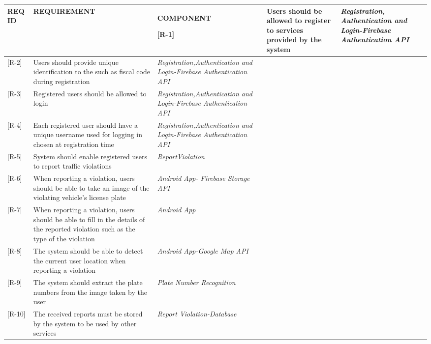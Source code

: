 \begin{table}[H]
\footnotesize
\centering
\settowidth{}
\setlength\extrarowheight{2pt}
\begin{tabulary}{\textwidth}{|J|J|J|}
\hline
 \textbf{REQ ID} & \textbf{REQUIREMENT} & \textbf{COMPONENT}   \hline

 [R-1] & Users should be allowed to register to services provided by the system & \emph{Registration, Authentication and Login-Firebase Authentication API} \\ \hline 
 
 [R-2] & Users should provide unique identification to the such as fiscal code during registration & \emph{Registration,Authentication and Login-Firebase Authentication API} 		\\ \hline 
 
 [R-3] & Registered users should be allowed to login & \emph{Registration,Authentication and Login-Firebase Authentication API} 		\\ \hline 
 
 [R-4] & Each registered user should have a unique username used for logging in chosen at registration time & \emph{Registration,Authentication and Login-Firebase Authentication API} 		\\ \hline 
 
 [R-5] & System should enable registered users to report traffic violations & \emph{ReportViolation} 		\\ \hline 
 
 [R-6] & When reporting a violation, users should be able to take an image of the violating vehicle’s license plate& \emph{Android App- Firebase Storage API} 		\\ \hline 
 
 [R-7] & When reporting a violation, users should be able to fill in the details of the reported violation such as the type of the violation & \emph{Android App} 		\\ \hline 
 
 [R-8] & The system should be able to detect the current user location when reporting a violation & \emph{Android App-Google Map API } 		\\ \hline 
 
 [R-9] & The system should extract the plate numbers from the image taken by the user & \emph{ Plate Number Recognition} 		\\ \hline 

 [R-10] & The received reports must be stored by the system to be used by other services & \emph{Report Violation-Database} 		\\ \hline 


\end{tabulary}
\end{table}
